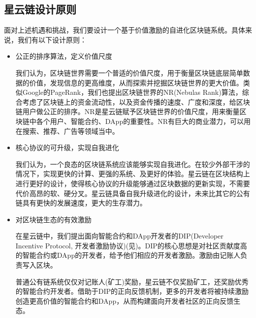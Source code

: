 \subsection{星云链设计原则}
面对上述机遇和挑战，我们要设计一个基于价值激励的自进化区块链系统。具体来说，我们有以下设计原则：
\begin{itemize}

	\item 公正的排序算法，定义价值尺度

我们认为，区块链世界需要一个普适的价值尺度，用于衡量区块链底层简单数据的价值，发现信息的更高维度，从而探索并挖掘区块链世界的更大价值。类似Google的PageRank\cite{Brin2010}\cite{page1999pagerank}，我们也提出区块链世界的NR(Nebulas Rank)算法，综合考虑了区块链上的资金流动性，以及资金传播的速度、广度和深度，给区块链用户做公正的排序。NR是星云链赋予区块链世界的价值尺度，用来衡量区块链中各个用户、智能合约、DApp的重要性。NR有巨大的商业潜力，可以用在搜索、推荐、广告等领域当中。


	\item 核心协议的可升级，实现自我进化

我们认为，一个良态的区块链系统应该能够实现自我进化。在较少外部干涉的情况下，实现更快的计算、更强的系统、及更好的体验。星云链在区块结构上进行更好的设计，使得核心协议的升级能够通过区块数据的更新实现，不需要代价高昂的软、硬分叉。星云链具备自我升级进化的设计，未来比其它的公有链具有更快的发展速度，更大的生存潜力。

	\item 对区块链生态的有效激励

在星云链中，我们提出面向智能合约和DApp开发者的DIP(Developer Incentive Protocol, 开发者激励协议)(见)。DIP的核心思想是对社区贡献度高的智能合约或DApp的开发者，给予他们相应的开发者激励。激励由记账人负责写入区块。

普通公有链系统仅仅对记账人(矿工)奖励，星云链不仅奖励矿工，还奖励优秀的智能合约开发者。借助于DIP的正向反馈机制，更多的开发者将被持续激励创造更高价值的智能合约和DApp，从而构建面向开发者社区的正向反馈生态。




\end{itemize}
